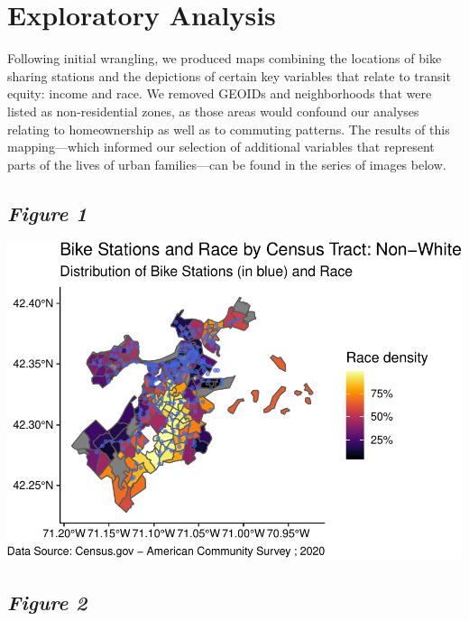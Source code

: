\documentclass[
  12pt,
]{article}
\begin{document}
\newpage

\hypertarget{exploratory-analysis}{%
\section{Exploratory Analysis}\label{exploratory-analysis}}

Following initial wrangling, we produced maps combining the locations of
bike sharing stations and the depictions of certain key variables that
relate to transit equity: income and race. We removed GEOIDs and
neighborhoods that were listed as non-residential zones, as those areas
would confound our analyses relating to homeownership as well as to
commuting patterns. The results of this mapping---which informed our
selection of additional variables that represent parts of the lives of
urban families---can be found in the series of images below.

\hypertarget{figure-1}{%
\subsection{\texorpdfstring{\emph{Figure 1}}{Figure 1}}\label{figure-1}}

\begin{flushleft}\includegraphics{Project_Template_files/figure-latex/develop plots race non-white-1} \end{flushleft}
\newpage

\hypertarget{figure-2}{%
\subsection{\texorpdfstring{\emph{Figure 2}}{Figure 2}}\label{figure-2}}
\end{document}
